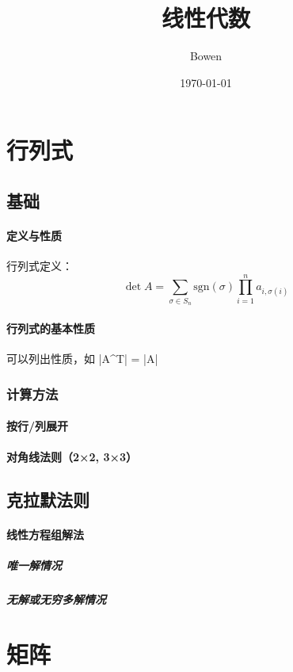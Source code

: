 \documentclass[a4paper,12pt]{article}
\begin{document}
    \title{线性代数}
    \author{Bowen}
    \date{\today}
    \maketitle

    \section{行列式}

    \subsection{基础}
    \paragraph{定义与性质}
    行列式定义：
    \[
        \det A = \sum_{\sigma \in S_n} \text{sgn}(\sigma) \prod_{i=1}^n a_{i, \sigma(i)}
    \]

    \paragraph{行列式的基本性质}
     可以列出性质，如 |A^T| = |A|

    \subsubsection{计算方法}
    \paragraph{按行/列展开}
    \paragraph{对角线法则（2×2, 3×3）}

    \subsection{克拉默法则}
    \paragraph{线性方程组解法}
    \subparagraph{唯一解情况}
    \subparagraph{无解或无穷多解情况}

    \section{矩阵}
\end{document}
